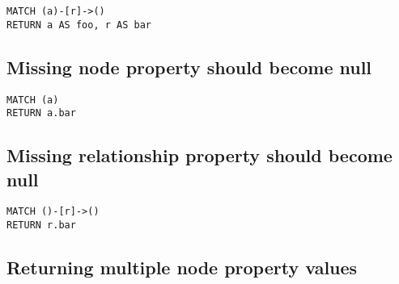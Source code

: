 \begin{lstlisting}
MATCH (a)-[r]->()
RETURN a AS foo, r AS bar
\end{lstlisting}

\subsection{Missing node property should become null}

\begin{lstlisting}
MATCH (a)
RETURN a.bar
\end{lstlisting}

\subsection{Missing relationship property should become null}

\begin{lstlisting}
MATCH ()-[r]->()
RETURN r.bar
\end{lstlisting}

\subsection{Returning multiple node property values}

